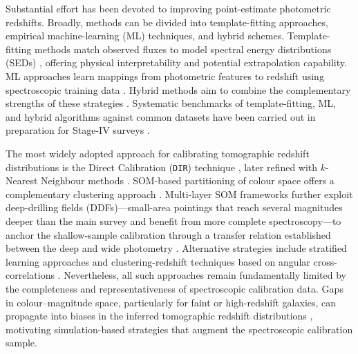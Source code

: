 Substantial effort has been devoted to improving point-estimate photometric redshifts. Broadly, methods can be divided into template-fitting approaches, empirical machine-learning (ML) techniques, and hybrid schemes. Template-fitting methods match observed fluxes to model spectral energy distributions (SEDs) \citep[e.g.][]{1999MNRAS.310..540A, 2000ApJ...536..571B, 2006A&A...457..841I, 2006AJ....132..926C, 2006MNRAS.372..565F, 2008ApJ...686.1503B, 2017ApJ...838....5L}, offering physical interpretability and potential extrapolation capability. ML approaches learn mappings from photometric features to redshift using spectroscopic training data \citep[e.g.][]{2004PASP..116..345C, 2012A&A...546A..13C, 2016PASP..128j4502S, 2016MNRAS.462..726A, 2017MNRAS.465.1959C, 2018MNRAS.473.3969R, 2020MNRAS.499.1587S, 2024AJ....168...80C, 2025OJAp....8E..50M}. Hybrid methods aim to combine the complementary strengths of these strategies \citep[e.g.][]{2019ApJ...881...80L, 2024MNRAS.530.2012T, 2025A&A...698A.276J}. Systematic benchmarks of template-fitting, ML, and hybrid algorithms against common datasets have been carried out in preparation for Stage-IV surveys \citep{2020A&A...644A..31E}.

The most widely adopted approach for calibrating tomographic redshift distributions is the Direct Calibration (\texttt{DIR}) technique \citep{2008MNRAS.390..118L, 2009MNRAS.396.2379C}, later refined with \(k\)-Nearest Neighbour methods \citep{2016MNRAS.463..635H, 2020A&A...633A..69H}. SOM-based partitioning of colour space offers a complementary clustering approach \citep{2020A&A...637A.100W, 2025arXiv250319440W, 2026A&A...707A.277R}. Multi-layer SOM frameworks further exploit deep-drilling fields (DDFs)---small-area pointings that reach several magnitudes deeper than the main survey and benefit from more complete spectroscopy---to anchor the shallow-sample calibration through a transfer relation established between the deep and wide photometry \citep{2019MNRAS.489..820B, 2021MNRAS.505.4249M, 2024arXiv240800922C, 2025arXiv250907964G, 2025arXiv251023566Y}. Alternative strategies include stratified learning approaches \citep{2024MNRAS.534.3808A} and clustering-redshift techniques based on angular cross-correlations \citep{2008ApJ...684...88N, 2020A&A...642A.200V, 2023MNRAS.524.5109R, 2025A&A...702A.155D}. Nevertheless, all such approaches remain fundamentally limited by the completeness and representativeness of spectroscopic calibration data. Gaps in colour--magnitude space, particularly for faint or high-redshift galaxies, can propagate into biases in the inferred tomographic redshift distributions \citep{2015ApJ...813...53M, 2020MNRAS.496.4769H}, motivating simulation-based strategies that augment the spectroscopic calibration sample.

